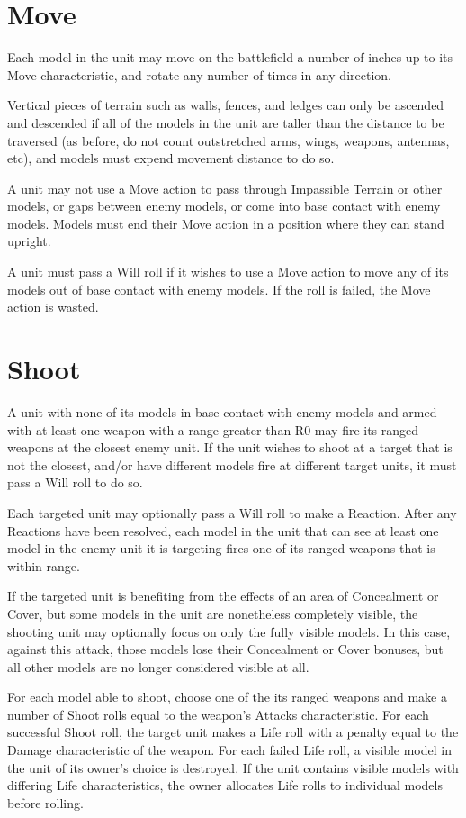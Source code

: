 \begin{multicols}{2}
\section*{Move}
Each model in the unit may move on the battlefield a number of inches up to its Move characteristic, and rotate any number of times in any direction.

Vertical pieces of terrain such as walls, fences, and ledges can only be ascended and descended if all of the models in the unit are taller than the distance to be traversed (as before, do not count outstretched arms, wings, weapons, antennas, etc), and models must expend movement distance to do so.

A unit may not use a Move action to pass through Impassible Terrain or other models, or gaps between enemy models, or come into base contact with enemy models. Models must end their Move action in a position where they can stand upright. 

A unit must pass a Will roll if it wishes to use a Move action to move any of its models out of base contact with enemy models. If the roll is failed, the Move action is wasted.




\section*{Shoot}
A unit with none of its models in base contact with enemy models and armed with at least one weapon with a range greater than R0 may fire its ranged weapons at the closest enemy unit. If the unit wishes to shoot at a target that is not the closest, and/or have different models fire at different target units, it must pass a Will roll to do so.

Each targeted unit may optionally pass a Will roll to make a Reaction. After any Reactions have been resolved, each model in the unit that can see at least one model in the enemy unit it is targeting fires one of its ranged weapons that is within range.

If the targeted unit is benefiting from the effects of an area of Concealment or Cover, but some models in the unit are nonetheless completely visible, the shooting unit may optionally focus on only the fully visible models. In this case, against this attack, those models lose their Concealment or Cover bonuses, but all other models are no longer considered visible at all.

For each model able to shoot, choose one of the its ranged weapons and make a number of Shoot rolls equal to the weapon's Attacks characteristic. For each successful Shoot roll, the target unit makes a Life roll with a penalty equal to the Damage characteristic of the weapon. For each failed Life roll, a visible model in the unit of its owner's choice is destroyed. If the unit contains visible models with differing Life characteristics, the owner allocates Life rolls to individual models before rolling.


\end{multicols}

